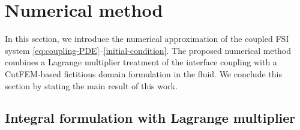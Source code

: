 \documentclass[11pt,reqno]{amsart}
\theoremstyle{definition}
\theoremstyle{plain}
\numberwithin{theorem}{section}
\numberwithin{proposition}{section}
\numberwithin{lemma}{section}
\numberwithin{equation}{section}
\newcommand{\bs}[1]{\boldsymbol{#1}}
\newcommand{\uu}[1]  {{\bs{#1}} }
\newcommand{\dep}{{{\bs{d}}}}
\newcommand{\vel}{{\bs\dot{\dep}}} %
\newcommand{\bu}{\uu{u}}
\renewcommand{\(}{\bigl(}
\renewcommand{\)}{\bigr)}
\newcommand{\mf}[1]{{\color{red}  #1}}
\begin{document}



\section{Numerical method}\label{section:numerical}

In this section, we introduce the numerical approximation of the coupled FSI system \eqref{eq:coupling-PDE}--\eqref{initial-condition}. 
The proposed numerical method combines a Lagrange multiplier treatment of the interface coupling with a CutFEM-based fictitious domain formulation in the fluid. We conclude this section by stating the main result of this work. 

\subsection{Integral formulation with Lagrange multiplier}
\label{section:integral-form}
\end{document}
